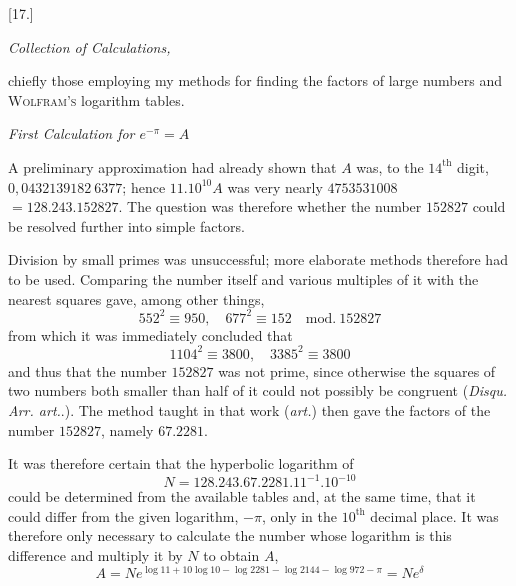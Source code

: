 \begingroup
\renewcommand{\arraystretch}{1.45}
\newcommand{\GaussIIITranscriptionDigits}[1]{\text{\ttfamily #1}}

\par\medskip{}\centerline{[17.]}

\begin{center}\textit{Collection of Calculations,}\end{center}
chiefly those employing my methods for finding the factors of large
numbers and \textsc{Wolfram's} logarithm tables.

\begin{center}\textit{First Calculation for $e^{-\pi}=A$}\end{center}

A preliminary approximation had already shown that $A$ was, to the
$14^{\mathrm{th}}$ digit, $0,0432139182\ 6377$; hence $11.10^{10}A$ was very nearly $4753531008$
$=128.243.152827$. The question was therefore whether the number $152827$ could be resolved further into simple
factors.

Division by small primes was unsuccessful; more elaborate methods therefore
had to be used. Comparing the number itself and various multiples of it with
the nearest squares gave, among other things,
\[
552^2\equiv950,\quad677^2\equiv152\quad\mathrm{mod.}\ 152827
\]
from which it was immediately concluded that
\[
1104^2\equiv3800,\quad3385^2\equiv3800
\]
and thus that the number $152827$ was not prime, since otherwise the squares of two
numbers both smaller than half of it could not possibly be congruent
(\textit{Disqu. Arr. art.}\quad.). The method taught in that work
(\textit{art.}\quad) then gave the factors of the number $152827$, namely $67.2281$.

It was therefore certain that the hyperbolic logarithm of
\[
N=128.243.67.2281.11^{-1}.10^{-10}
\]
could be determined from the available tables and, at the same time, that it could
differ from the given logarithm, $-\pi$, only in the $10^{\mathrm{th}}$ decimal place.
It was therefore only necessary to calculate the number whose logarithm is this
difference and multiply it by $N$ to obtain $A$,
\[
A=Ne^{\log11+10\log10-\log2281-\log2144-\log972-\pi}=Ne^\delta
\]


